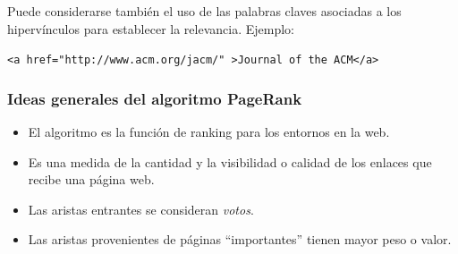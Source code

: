 \documentclass[
10pt, %
aspectratio=169, %
]{beamer}
\begin{document}
\begin{frame}
{			\vspace{1\baselineskip}
			Puede considerarse también el uso de las palabras claves asociadas a los hipervínculos para establecer la relevancia. Ejemplo:
			
			\centering
			\texttt{<a href="http://www.acm.org/jacm/" >Journal of the ACM</a>}
			
		}
		
	\end{frame}
	
	\begin{frame}
		
		\frametitle{Ideas generales del algoritmo PageRank}
		
		\begin{itemize}
			
			\item El algoritmo es la función de ranking para los entornos en la web. \\[2mm]
			
			\item Es una medida de la cantidad y la visibilidad o calidad de los enlaces que recibe una página web.  \\[2mm]
			
			\item Las aristas entrantes se consideran \emph{votos}. \\[2mm]
			
			\item Las aristas provenientes de páginas ``importantes'' tienen mayor peso o valor.
			
		\end{itemize}
		
	\end{frame}
	
\end{document}
